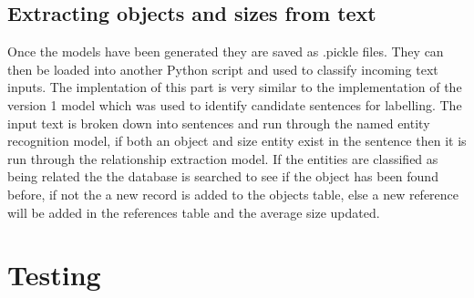 \documentclass[11pt,oneside]{book}
\begin{document}
\subsection{Extracting objects and sizes from text}
Once the models have been generated they are saved as .pickle files. They can then be loaded into another Python script and used to classify incoming text inputs. The implentation of this part is very similar to the implementation of the version 1 model which was used to identify candidate sentences for labelling. The input text is broken down into sentences and run through the named entity recognition model, if both an object and size entity exist in the sentence then it is run through the relationship extraction model. If the entities are classified as being related the the database is searched to see if the object has been found before, if not the a new record is added to the objects table, else a new reference will be added in the references table and the average size updated.


\section{Testing}
\end{document}
